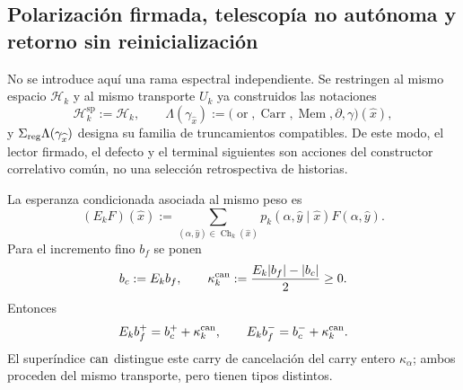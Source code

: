 \subsection{Polarización firmada, telescopía no autónoma y retorno sin reinicialización}
No se introduce aquí una rama espectral independiente. Se restringen al
mismo espacio \(\mathscr H_k\) y al mismo transporte \(U_k\) ya construidos
las notaciones
\[
 \mathcal H_k^{\mathrm{sp}}:=\mathscr H_k,
 \qquad
 \Lambda(\gamma_{\widehat x})
 :=\bigl(\operatorname{or},\operatorname{Carr},\operatorname{Mem},
          \partial,\gamma\bigr)(\widehat x),
\]
y \(\Sigma_{\rm reg}\Lambda(\gamma_{\widehat x})\) designa su familia de
truncamientos compatibles. De este modo, el lector firmado, el defecto y el
terminal siguientes son acciones del constructor correlativo común, no una
selección retrospectiva de historias.
\begingroup
  \let\section\subsection
  
  
\endgroup

La esperanza condicionada asociada al mismo peso es
\begin{equation}
\label{eq:pdfv2-cor-esperanza-comun}
 (E_kF)(\widehat x):=
 \sum_{(\alpha,\widehat y)\in\operatorname{Ch}_k(\widehat x)}
 p_k(\alpha,\widehat y\mid\widehat x)F(\alpha,\widehat y).
\end{equation}
Para el incremento fino \(b_f\) se ponen
\begin{equation}
\label{eq:pdfv2-cor-kappa-jensen}
 b_c:=E_kb_f,\qquad
 \kappa_k^{\rm can}:=\frac{E_k|b_f|-|b_c|}{2}\geq0.
\end{equation}
Entonces
\begin{equation}
\label{eq:pdfv2-cor-jensen-hojas}
 E_kb_f^+=b_c^++\kappa_k^{\rm can},\qquad
 E_kb_f^-=b_c^-+\kappa_k^{\rm can}.
\end{equation}
El superíndice \({\rm can}\) distingue este carry de cancelación del carry
entero \(\kappa_\alpha\); ambos proceden del mismo transporte, pero tienen
tipos distintos.

